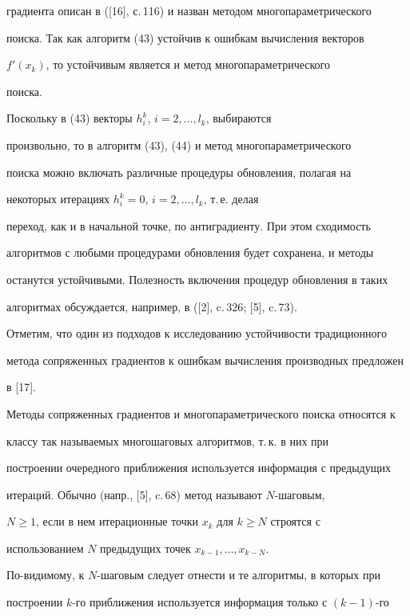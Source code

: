 градиента описан в ([16], с.\,116) и назван методом многопараметрического


поиска. Так как алгоритм (43) устойчив к ошибкам вычисления векторов


${f}'(x_k)$, то устойчивым является и метод многопараметрического


поиска.





Поскольку в (43) векторы $h_i^k$, $i=2,\dotsc,l_k$, выбираются


произвольно, то в алгоритм (43), (44) и метод многопараметрического


поиска можно включать различные процедуры обновления, полагая на


некоторых итерациях $h_i^k=0$, $i=2,\dotsc,l_k$, т.\,е. делая


переход, как и в начальной точке, по антиградиенту. При этом сходимость


алгоритмов с любыми процедурами обновления будет сохранена, и методы


останутся устойчивыми. Полезность включения процедур обновления в таких


алгоритмах обсуждается, например, в ([2], c.\,326; [5], c.\,73).





Отметим, что один из подходов к исследованию устойчивости традиционного


метода сопряженных градиентов к ошибкам вычисления производных предложен


в [17].





Методы сопряженных градиентов и многопараметрического поиска относятся к


классу так называемых многошаговых алгоритмов, т.\,к. в них при


построении очередного приближения используется информация с предыдущих


итераций. Обычно (напр., [5], c.\,68) метод называют $N$-шаговым,


$N\ge 1$, если в нем итерационные точки $x_k$ для $k\ge N$ строятся с


использованием $N$ предыдущих точек $x_{k-1},\dotsc,x_{k-N}$.


По-видимому, к $N$-шаговым следует отнести и те алгоритмы, в которых при


построении $k$-го приближения используется информация только с $(k-1)$-го


